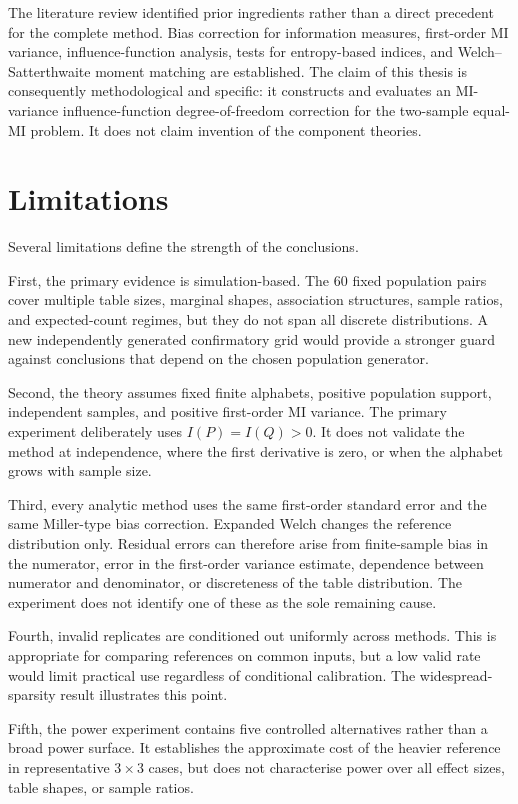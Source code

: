 The literature review identified prior ingredients rather than a direct
precedent for the complete method. Bias correction for information measures,
first-order MI variance, influence-function analysis, tests for entropy-based
indices, and Welch--Satterthwaite moment matching are established. The claim
of this thesis is consequently methodological and specific: it constructs and
evaluates an MI-variance influence-function degree-of-freedom correction for
the two-sample equal-MI problem. It does not claim invention of the component
theories.

\section{Limitations}

Several limitations define the strength of the conclusions.

First, the primary evidence is simulation-based. The 60 fixed population
pairs cover multiple table sizes, marginal shapes, association structures,
sample ratios, and expected-count regimes, but they do not span all discrete
distributions. A new independently generated confirmatory grid would provide
a stronger guard against conclusions that depend on the chosen population
generator.

Second, the theory assumes fixed finite alphabets, positive population
support, independent samples, and positive first-order MI variance. The
primary experiment deliberately uses $I(P)=I(Q)>0$. It does not validate
the method at independence, where the first derivative is zero, or when the
alphabet grows with sample size.

Third, every analytic method uses the same first-order standard error and the
same Miller-type bias correction. Expanded Welch changes the reference
distribution only. Residual errors can therefore arise from finite-sample
bias in the numerator, error in the first-order variance estimate, dependence
between numerator and denominator, or discreteness of the table distribution.
The experiment does not identify one of these as the sole remaining cause.

Fourth, invalid replicates are conditioned out uniformly across methods. This
is appropriate for comparing references on common inputs, but a low valid
rate would limit practical use regardless of conditional calibration. The
widespread-sparsity result illustrates this point.

Fifth, the power experiment contains five controlled alternatives rather than
a broad power surface. It establishes the approximate cost of the heavier
reference in representative $3\times3$ cases, but does not characterise
power over all effect sizes, table shapes, or sample ratios.

